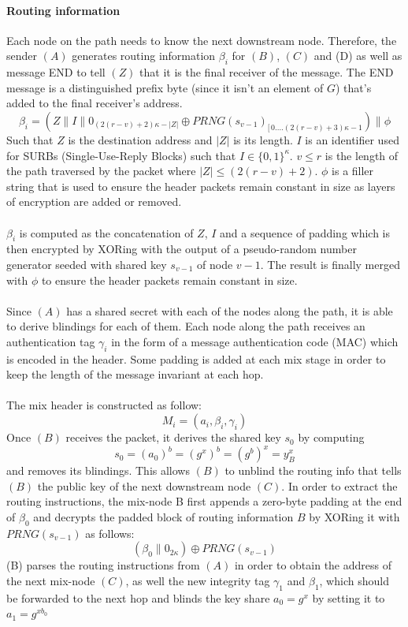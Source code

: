 \paragraph{Routing information}
Each node on the path needs to know the next downstream node. Therefore, the sender $(A)$ generates routing information $\beta_i$ for $(B)$, $(C)$ and (D) as well as message END to tell $(Z)$ that it is the final receiver of the message. The END message is a distinguished prefix byte (since it isn't an element of $G$) that's added to the final receiver's address.
$$\beta_i=(Z\|I\|0_{(2(r-v)+2)\kappa-|Z|}\oplus PRNG(s_{v-1})_{[ \,0....(2(r-v)+3)\kappa-1})\|\phi$$
Such that $Z$ is the destination address and $|Z|$ is its length. $I$ is an identifier used for SURBs (Single-Use-Reply Blocks) such that $I \in \{0, 1\}^\kappa$.
$v\leq r$ is the length of the path traversed by the packet where $|Z| \leq (2(r - v) + 2)$. $\phi$ is a filler string that is used to ensure the header packets remain constant in size as layers of encryption are added or removed. 
\\~\\$\beta_i$ is computed as the concatenation of $Z$, $I$ and a sequence of padding which is then encrypted by XORing with the output of a pseudo-random number generator seeded with shared key $s_{v-1}$ of node $v-1$. The result is finally merged with $\phi$ to ensure the header packets remain constant in size.
\\~\\Since $(A)$ has a shared secret with each of the nodes along the path, it is able to derive blindings for each of them. 
\newline Each node along the path receives an authentication tag $\gamma_i$ in the form of a message authentication code (MAC)
which is encoded in the header.
\newline Some padding is added at each mix stage in order to keep the length of the message invariant at each hop. 
\\~\\The mix header is constructed as follow: $$M_i=(a_i,\beta_i,\gamma_i)$$ 
\newline Once $(B)$ receives the packet, it derives the shared key $s_0$ by computing $$s_0=(a_0)^b=(g^x)^b=(g^b)^x=y^x_B$$ and removes its blindings. This allows $(B)$ to unblind the routing info that tells $(B)$ the public key of the next downstream node $(C)$. In order to extract the routing instructions, the mix-node B first appends a zero-byte padding at the end of $\beta_0$ and decrypts the padded block of routing information $B$ by XORing it with $PRNG(s_{v-1})$ as follows:
$$(\beta_0\|0_{2\kappa})\oplus PRNG(s_{v-1})$$
(B) parses the routing instructions from $(A)$ in order to obtain the address of the next mix-node $(C)$, as well the new integrity tag $\gamma_1$ and $\beta_1$, which should be forwarded to the next hop and blinds the key share $a_0=g^x$ by setting it to $a_1=g^{xb_0}$
